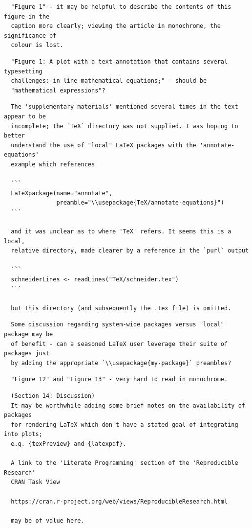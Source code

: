 \documentclass{article}
\begin{document}
\begin{verbatim}
  "Figure 1" - it may be helpful to describe the contents of this figure in the
  caption more clearly; viewing the article in monochrome, the significance of
  colour is lost.
\end{verbatim}

\begin{verbatim}
  "Figure 1: A plot with a text annotation that contains several typesetting
  challenges: in-line mathematical equations;" - should be
  "mathematical expressions"?
\end{verbatim}

\begin{verbatim}
  The 'supplementary materials' mentioned several times in the text appear to be
  incomplete; the `TeX` directory was not supplied. I was hoping to better
  understand the use of "local" LaTeX packages with the 'annotate-equations'
  example which references

  ```
  LaTeXpackage(name="annotate",
               preamble="\\usepackage{TeX/annotate-equations}")
  ```

  and it was unclear as to where 'TeX' refers. It seems this is a local, 
  relative directory, made clearer by a reference in the `purl` output

  ```
  schneiderLines <- readLines("TeX/schneider.tex")
  ```

  but this directory (and subsequently the .tex file) is omitted.
\end{verbatim}

\begin{verbatim}
  Some discussion regarding system-wide packages versus "local" package may be
  of benefit - can a seasoned LaTeX user leverage their suite of packages just 
  by adding the appropriate `\\usepackage{my-package}` preambles?
\end{verbatim}

\begin{verbatim}
  "Figure 12" and "Figure 13" - very hard to read in monochrome.
\end{verbatim}

\begin{verbatim}
  (Section 14: Discussion)
  It may be worthwhile adding some brief notes on the availability of packages
  for rendering LaTeX which don't have a stated goal of integrating into plots;
  e.g. {texPreview} and {latexpdf}.

  A link to the 'Literate Programming' section of the 'Reproducible Research'
  CRAN Task View

  https://cran.r-project.org/web/views/ReproducibleResearch.html

  may be of value here.
\end{verbatim}
\end{document}
